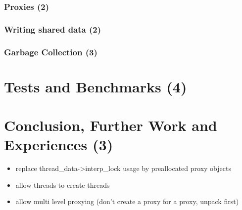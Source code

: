 \documentclass[bachelor,english]{hgbthesis}
\begin{document}
\subsection{Proxies (2)}

\subsection{Writing shared data (2)}

\subsection{Garbage Collection (3)}

\chapter{Tests and Benchmarks (4)}

\chapter{Conclusion, Further Work and Experiences (3)}

\begin{itemize}
\item replace thread\_data->interp\_lock usage by preallocated proxy objects
\item allow threads to create threads
\item allow multi level proxying (don't create a proxy for a proxy, unpack first)
\end{itemize}



\end{document}
